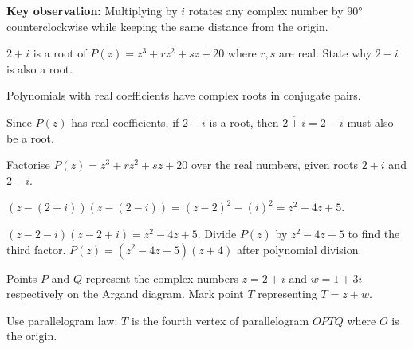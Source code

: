 \begin{solution}[Sketch]
\begin{center}
\end{center}
\vspace{0.5em}

\textbf{Key observation:} Multiplying by $i$ rotates any complex number by $90°$ counterclockwise while keeping the same distance from the origin.

\end{solution}

\begin{problem}
$2+i$ is a root of $P(z) = z^3 + rz^2 + sz + 20$ where $r,s$ are real. State why $2-i$ is also a root.
\end{problem}

\begin{hint}
Polynomials with real coefficients have complex roots in conjugate pairs.
\end{hint}

\begin{solution}[Sketch]
Since $P(z)$ has real coefficients, if $2+i$ is a root, then $\overline{2+i} = 2-i$ must also be a root.
\end{solution}

\begin{problem}
Factorise $P(z) = z^3 + rz^2 + sz + 20$ over the real numbers, given roots $2+i$ and $2-i$.
\end{problem}

\begin{hint}
$(z-(2+i))(z-(2-i)) = (z-2)^2 - (i)^2 = z^2 - 4z + 5$.
\end{hint}

\begin{solution}[Sketch]
$(z-2-i)(z-2+i) = z^2-4z+5$. Divide $P(z)$ by $z^2-4z+5$ to find the third factor. $P(z) = (z^2-4z+5)(z+4)$ after polynomial division.
\end{solution}

\begin{problem}
Points $P$ and $Q$ represent the complex numbers 
$z = 2 + i$ and $w = 1 + 3i$ respectively on the Argand diagram. 
Mark point $T$ representing $ T = z+w$.
\end{problem}

\begin{hint}
Use parallelogram law: $T$ is the fourth vertex of parallelogram $OPTQ$ where $O$ is the origin.
\end{hint}

